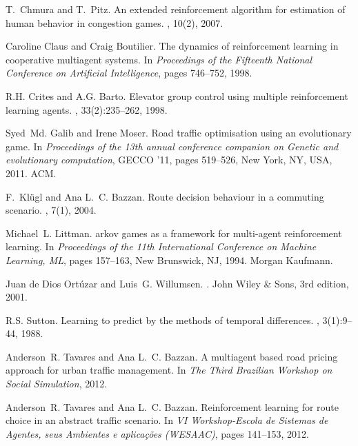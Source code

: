 \documentclass{RITA}
\begin{document}
\begin{thebibliography}{10}
T.~Chmura and T.~Pitz.
\newblock An extended reinforcement algorithm for estimation of human behavior
  in congestion games.
, 10(2),
  2007.

Caroline Claus and Craig Boutilier.
\newblock The dynamics of reinforcement learning in cooperative multiagent
  systems.
\newblock In {\em Proceedings of the Fifteenth National Conference on
  Artificial Intelligence}, pages 746--752, 1998.

R.H. Crites and A.G. Barto.
\newblock Elevator group control using multiple reinforcement learning agents.
, 33(2):235--262, 1998.

Syed~Md. Galib and Irene Moser.
\newblock Road traffic optimisation using an evolutionary game.
\newblock In {\em Proceedings of the 13th annual conference companion on
  Genetic and evolutionary computation}, GECCO '11, pages 519--526, New York,
  NY, USA, 2011. ACM.

F.~Kl\"ugl and Ana L.~C. Bazzan.
\newblock Route decision behaviour in a commuting scenario.
, 7(1),
  2004.

Michael~L. Littman.
arkov games as a framework for multi-agent reinforcement learning.
\newblock In {\em Proceedings of the 11th International Conference on Machine
  Learning, {ML}}, pages 157--163, New Brunswick, NJ, 1994. Morgan Kaufmann.

{Juan de Dios} Ort\'uzar and Luis~G. Willumsen.
.
\newblock John Wiley \& Sons, 3rd edition, 2001.

R.S. Sutton.
\newblock Learning to predict by the methods of temporal differences.
, 3(1):9--44, 1988.

Anderson~R. Tavares and Ana L.~C. Bazzan.
\newblock A multiagent based road pricing approach for urban traffic
  management.
\newblock In {\em The Third Brazilian Workshop on Social Simulation}, 2012.

Anderson~R. Tavares and Ana L.~C. Bazzan.
\newblock Reinforcement learning for route choice in an abstract traffic
  scenario.
\newblock In {\em VI Workshop-Escola de Sistemas de Agentes, seus Ambientes e
  aplica\c{c}\~oes (WESAAC)}, pages 141--153, 2012.


\end{thebibliography}
\end{document}
